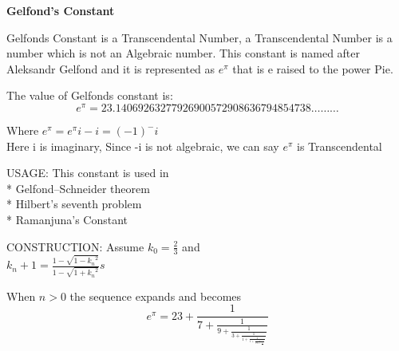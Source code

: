 \documentclass[12]{resume} %
\begin{document}
\begin{rSection}
{\Large \textbf{Gelfond's Constant}}\vspace{1em}
\end{rSection}


Gelfonds Constant is a Transcendental Number,  a Transcendental Number is a number which is not an Algebraic number. This constant is named after Aleksandr Gelfond and it is represented as
$e^\pi$  that is e raised to the power Pie.


The value of Gelfonds constant is:
$$e^\pi  =23.14069263277926900572908636794854738………$$

     Where     $e^\pi= {e^{\pi} i}-i= (-1)^-i$\\
Here i is imaginary, Since -i is not algebraic, we can say $e^\pi$ is Transcendental 


\begin{rSection}{USAGE:}
This constant is used in \\
 * Gelfond–Schneider theorem\\
* Hilbert's seventh problem\\
* Ramanjuna’s Constant\\

\end{rSection}

\begin{rSection}{CONSTRUCTION:}
Assume   $\displaystyle{k_0=  \frac{2}{3}}$  and\\
$\displaystyle{k_n+1 = \frac{1-\sqrt{1-{k_n}^2}}{1-\sqrt{1+{k_n}^2}}}s$
  

When $n>0$ the sequence expands and becomes\\

{\Large$$e^\pi = 23 + \frac{1}{7 + \frac{1}{9 + \frac{1}{3 + \frac{1}{1 + \frac{1}{1 + \frac{1}{591 + \frac{1}{...}}}}}}}$$}

\end{rSection}
\end{document}
